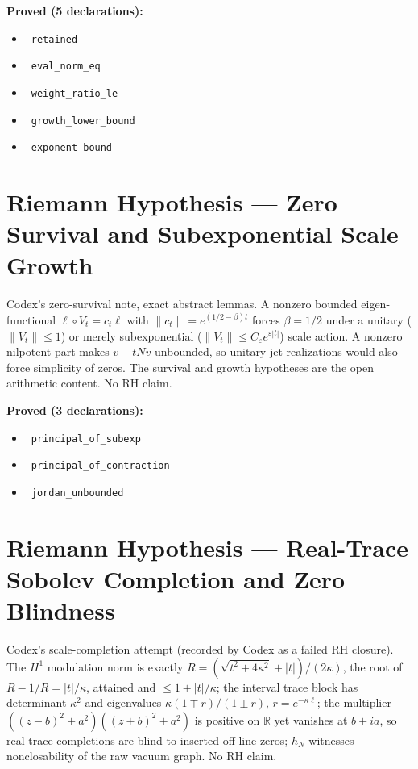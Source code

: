 \documentclass{report}
\theoremstyle{definition}
\begin{document}
\noindent\textbf{Proved (5 declarations):}
\begin{itemize}
  \item {}\leanok\ \texttt{retained}
  \item {}\leanok\ \texttt{eval\_norm\_eq}
  \item {}\leanok\ \texttt{weight\_ratio\_le}
  \item {}\leanok\ \texttt{growth\_lower\_bound}
  \item {}\leanok\ \texttt{exponent\_bound}
\end{itemize}

\section{Riemann Hypothesis --- Zero Survival and Subexponential Scale Growth}
Codex's zero-survival note, exact abstract lemmas. A nonzero bounded eigen-functional $\ell\circ V_t=c_t\ell$ with $\|c_t\|=e^{(1/2-\beta)t}$ forces $\beta=1/2$ under a unitary ($\|V_t\|\le1$) or merely subexponential ($\|V_t\|\le C_\varepsilon e^{\varepsilon|t|}$) scale action. A nonzero nilpotent part makes $v-tNv$ unbounded, so unitary jet realizations would also force simplicity of zeros. The survival and growth hypotheses are the open arithmetic content. No RH claim.

\noindent\textbf{Proved (3 declarations):}
\begin{itemize}
  \item {}\leanok\ \texttt{principal\_of\_subexp}
  \item {}\leanok\ \texttt{principal\_of\_contraction}
  \item {}\leanok\ \texttt{jordan\_unbounded}
\end{itemize}

\section{Riemann Hypothesis --- Real-Trace Sobolev Completion and Zero Blindness}
Codex's scale-completion attempt (recorded by Codex as a failed RH closure). The $H^1$ modulation norm is exactly $R=(\sqrt{t^2+4\kappa^2}+|t|)/(2\kappa)$, the root of $R-1/R=|t|/\kappa$, attained and $\le1+|t|/\kappa$; the interval trace block has determinant $\kappa^2$ and eigenvalues $\kappa(1\mp r)/(1\pm r)$, $r=e^{-\kappa\ell}$; the multiplier $((z-b)^2+a^2)((z+b)^2+a^2)$ is positive on $\mathbb R$ yet vanishes at $b+ia$, so real-trace completions are blind to inserted off-line zeros; $h_N$ witnesses nonclosability of the raw vacuum graph. No RH claim.
\end{document}
